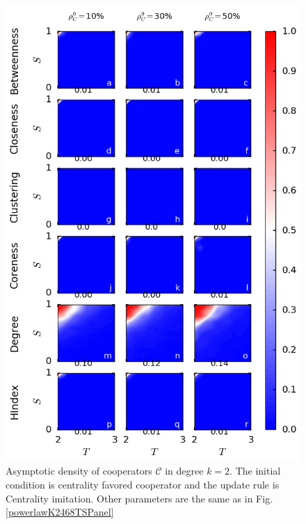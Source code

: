 \documentclass[preprint,12pt,3p]{elsarticle}
\begin{document}
\begin{figure}[htbp]
\centering
\includegraphics[width=13cm]{PowerlawK2RankUpdate.png}
\caption{Asymptotic density of cooperators $\mathcal{C}$ in degree $k=2$.
The initial condition is centrality favored cooperator and the update rule is Centrality imitation.
Other parameters are the same as in Fig.\ref{powerlawK2468TSPanel}}
\label{PowerlawK2RankUpdate}
\end{figure}
\end{document}
